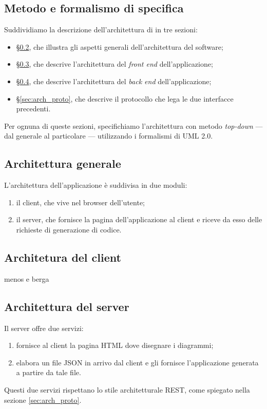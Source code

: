 


\subsection{Metodo e formalismo di specifica}
Suddividiamo la descrizione dell'architettura di \proj{} in tre sezioni:
\begin{itemize}
	\item §\ref{sec:arch_gen}, che illustra gli aspetti generali dell'architettura del software;
	\item §\ref{sec:arch_client}, che descrive l'architettura del \emph{front end} dell'applicazione;
	\item §\ref{sec:arch_server}, che descrive l'architettura del \emph{back end} dell'applicazione;
	\item §\ref{sec:arch_proto}, che descrive il protocollo che lega le due interfacce precedenti.
\end{itemize}
Per ognuna di queste sezioni, specifichiamo l'architettura con metodo \emph{top-down} --- dal generale al particolare --- utilizzando i formalismi di UML 2.0.



\subsection{Architettura generale} \label{sec:arch_gen}
L'architettura dell'applicazione è suddivisa in due moduli:
\begin{enumerate}
	\item il client, che vive nel browser dell'utente;
	\item il server, che fornisce la pagina dell'applicazione al client e riceve da esso delle richieste di generazione di codice.
\end{enumerate}



\subsection{Architetura del client} \label{sec:arch_client}
menos e berga



\subsection{Architettura del server} \label{sec:arch_server}
Il server offre due servizi:
\begin{enumerate}
	\item fornisce al client la pagina HTML dove disegnare i diagrammi;
	\item elabora un file JSON in arrivo dal client e gli fornisce l'applicazione generata a partire da tale file.
\end{enumerate}
Questi due servizi rispettano lo stile architetturale REST, come spiegato nella sezione \ref{sec:arch_proto}.

